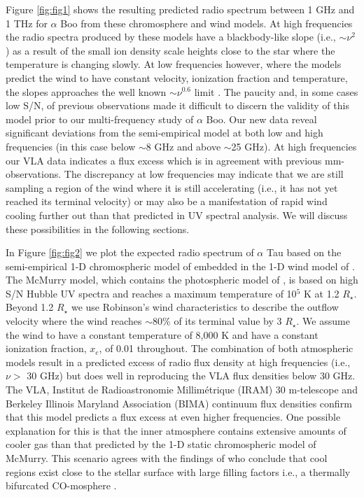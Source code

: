 \documentclass[iop]{emulateapj}
\begin{document}
Figure \ref{fig:fig1} shows the resulting predicted radio spectrum between 1 GHz and 1 THz for $\alpha$ Boo from these chromosphere and wind models. At high frequencies the radio spectra produced by these models have a blackbody-like slope (i.e., $\sim \nu ^{2}$) as a result of the small ion density scale heights close to the star where the temperature is changing slowly. At low frequencies however, where the models predict the wind to have constant velocity, ionization fraction and temperature, the slopes approaches the well known $\sim\nu ^{0.6}$ limit \citep{1975MNRAS.170...41W,1975AA....39..217O,1975AA....39....1P}. The paucity and, in some cases low S/N, of previous observations made it difficult to discern the validity of this model prior to our multi-frequency study of $\alpha$ Boo. Our new data reveal significant deviations from the semi-empirical model at both low and high frequencies (in this case below $\sim$8 GHz and above $\sim$25 GHz). At high frequencies our VLA data indicates a flux excess which is in agreement with previous mm-observations. The discrepancy at low frequencies may indicate that we are still sampling a region of the wind where it is still accelerating (i.e., it has not yet reached its terminal velocity) or may also be a manifestation of rapid wind cooling further out than that predicted in UV spectral analysis. We will discuss these possibilities in the following sections. 

In Figure \ref{fig:fig2} we plot the expected radio spectrum of $\alpha$ Tau based on the semi-empirical 1-D chromospheric model of \cite{1999MNRAS.302...37M} embedded in the 1-D wind model of \cite{1998ApJ...503..396R}. The McMurry model, which contains  the photospheric model of \cite{1973ApJ...180...81J}, is based on high S/N Hubble UV spectra and reaches a maximum temperature of 10$^{5}$ K at 1.2 $R_{\star}$. Beyond 1.2 $R_{\star}$ we use Robinson's wind characteristics to describe the outflow velocity where the wind reaches $\sim$80\% of its terminal value by 3 $R_{\star}$. We assume the wind to have a constant temperature of 8,000 K and have a constant ionization fraction, $x_{e}$, of 0.01 throughout. The combination of both atmospheric models result in a predicted excess of radio flux density at high frequencies (i.e., $\nu >$ 30 GHz) but does well in reproducing the VLA flux densities below 30 GHz. The VLA, Institut de Radioastronomie Millim\'{e}trique (IRAM) 30 m-telescope and Berkeley Illinois Maryland Association (BIMA) continuum flux densities confirm that this model predicts a flux excess at even higher frequencies. One possible explanation for this is that the inner atmosphere contains extensive amounts of cooler gas than that predicted by the 1-D static chromospheric model of McMurry. This scenario agrees with the findings of \cite{1994ApJ...423..806W} who conclude that cool regions exist close to the stellar surface with large filling factors i.e., a thermally bifurcated CO-mosphere \citep{1996IAUS..176..371A}.
\end{document}
